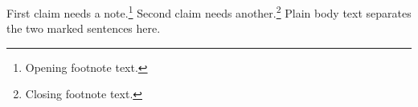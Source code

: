\documentclass{article}
\begin{document}
First claim needs a note.\footnote{Opening footnote text.}
Second claim needs another.\footnote{Closing footnote text.}
Plain body text separates the two marked sentences here.
\end{document}
